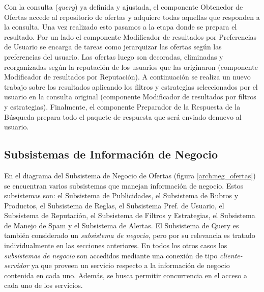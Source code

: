 Con la consulta (\emph{query}) ya definida y ajustada, el componente \textsf{Obtenedor de Ofertas} accede al repositorio de ofertas y adquiere todas aquellas que responden a la consulta.  Una vez realizado esto pasamos a la etapa donde se prepara el resultado. Por un lado el componente \textsf{Modificador de resultados por Preferencias de Usuario} se encarga de tareas como jerarquizar las ofertas según las preferencias del usuario. Las ofertas luego son decoradas, eliminadas y reorganizadas según la reputación de los usuarios que las originaron (componente \textsf{Modificador de resultados por Reputación}). A continuación se realiza un nuevo trabajo sobre los resultados aplicando los filtros y estrategias seleccionados por el usuario en la consulta original (componente \textsf{Modificador de resultados por filtros y estrategias}). Finalmente, el componente \textsf{Preparador de la Respuesta de la Búsqueda} prepara todo el paquete de respuesta que será enviado denuevo al usuario. 

\subsection{Subsistemas de Información de Negocio}

En el diagrama del \textsf{Subsistema de Negocio de Ofertas} (figura \ref{arch:neg_ofertas}) se encuentran varios subsistemas que manejan información de negocio. Estos subsistemas son: el \textsf{Subsistema de Publicidades}, el \textsf{Subsistema de Rubros y Productos}, el \textsf{Subsistema de Reglas}, el \textsf{Subsistema Pref. de Usuario}, el \textsf{Subsistema de Reputación}, el \textsf{Subsistema de Filtros y Estrategias}, el \textsf{Subsistema de Manejo de Spam} y el \textsf{Subsistema de Alertas}. El \textsf{Subsistema de Query} es también considerado un \emph{subsistema de negocio}, pero por su relevancia es tratado individualmente en las secciones anteriores.
En todos los otros casos los \emph{subsistemas de negocio} son accedidos mediante una conexión de tipo \emph{cliente-servidor} ya que proveen un servicio respecto a la información de negocio contenida en cada uno. Además, se busca permitir concurrencia en el acceso a cada uno de los servicios.

